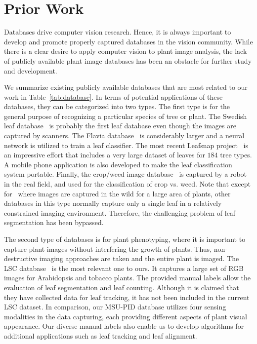 \section{Prior Work}
\label{sec:prior}

Databases drive computer vision research.
Hence, it is always important to develop and promote properly captured databases in the vision community.
While there is a clear desire to apply computer vision to plant image analysis, the lack of publicly available plant image databases has been an obstacle for further study and development.

We summarize existing publicly available databases that are most related to our work in Table~\ref{tab:database}.
In terms of potential applications of these databases, they can be categorized into two types.
The first type is for the general purpose of recognizing a particular species of tree or plant.
The Swedish leaf database~\cite{soderkvist2001computer} is probably the first leaf database even though the images are captured by scanners.
The Flavia database~\cite{wu2007leaf} is considerably larger and a neural network is utilized to train a leaf classifier.
The most recent Leafsnap project~\cite{kumar2012leafsnap} is an impressive effort that includes a very large dataset of leaves for $184$ tree types.
A mobile phone application is also developed to make the leaf classification system portable.
Finally, the crop/weed image database~\cite{haug2014crop} is captured by a robot in the real field, and used for the classification of crop vs. weed.
Note that except for~\cite{haug2014crop} where images are captured in the wild for a large area of plants, other databases in this type normally capture only a single leaf in a relatively constrained imaging environment.
Therefore, the challenging problem of leaf segmentation has been bypassed.

The second type of databases is for plant phenotyping, where it is important to capture plant images without interfering the growth of plants.
Thus, non-destructive imaging approaches are taken and the entire plant is imaged.
The LSC database~\cite{scharr2014annotated} is the most relevant one to ours.
It captures a large set of RGB images for Arabidopsis and tobacco plants.
The provided manual labels allow the evaluation of leaf segmentation and leaf counting.
Although it is claimed that they have collected data for leaf tracking, it has not been included in the current LSC dataset. 
In comparison, our MSU-PID database utilizes four sensing modalities in the data capturing, each providing different aspects of plant visual appearance.
Our diverse manual labels also enable us to develop algorithms for additional applications such as leaf tracking and leaf alignment.

